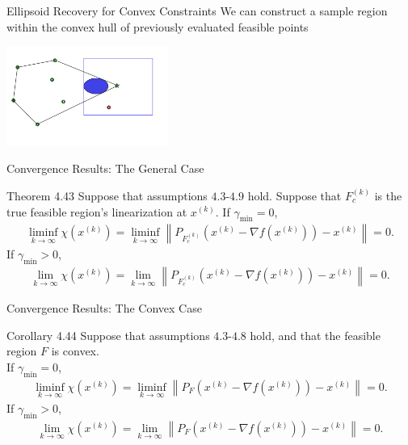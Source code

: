 \documentclass{beamer}
\newcommand{\xk}{{{x}^{(k)}}}
\begin{document}
\begin{frame}{Ellipsoid Recovery for Convex Constraints}
	We can construct a sample region within the convex hull of previously evaluated feasible points
	\begin{center}
		\includegraphics[width=200px]{images/convex_restoration.png}
	\end{center}
\end{frame}

\begin{frame}{Convergence Results: The General Case}
\begin{block}{Theorem 4.43}
Suppose that assumptions $4.3$-$4.9$ hold.
Suppose that $F_c^{(k)}$ is the true feasible region's linearization at $\xk$.
If $\gamma_{\textrm{min}} = 0$,
\begin{align*}
\liminf_{k\to\infty} \chi\left(\xk\right) = \liminf_{k\to\infty} \left\|P_{F_c^{(k)}}\left(\xk - \nabla f\left(\xk\right)\right) - \xk\right\| = 0.
\end{align*}
If $\gamma_{\textrm{min}} > 0$,
\begin{align*}
\lim_{k\to\infty} \chi\left(\xk\right) = \lim_{k\to\infty} \left\|P_{F_c^{(k)}}\left(\xk - \nabla f\left(\xk\right)\right) - \xk\right\| = 0.
\end{align*}
\end{block}
\end{frame}

\begin{frame}{Convergence Results: The Convex Case}
\begin{block}{Corollary 4.44}
Suppose that assumptions $4.3$-$4.8$ hold, and that the feasible region $F$ is convex. \\
If $\gamma_{\textrm{min}} = 0$,
\begin{align*}
\liminf_{k\to\infty} \chi\left(\xk\right) = \liminf_{k\to\infty} \left\|P_F\left(\xk - \nabla f\left(\xk\right)\right) - \xk\right\| = 0.
\end{align*}
If $\gamma_{\textrm{min}} > 0$,
\begin{align*}
\lim_{k\to\infty} \chi\left(\xk\right) = \lim_{k\to\infty} \left\|P_F\left(\xk - \nabla f\left(\xk\right)\right) - \xk\right\| = 0.
\end{align*}
\end{block}
\end{frame}
\end{document}
